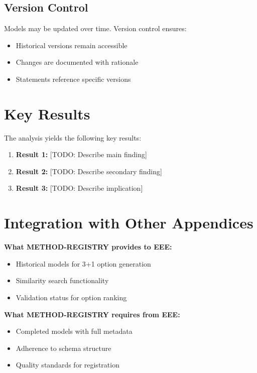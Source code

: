 \subsection{Version Control}

Models may be updated over time. Version control ensures:
\begin{itemize}
\item Historical versions remain accessible
\item Changes are documented with rationale
\item Statements reference specific versions
\end{itemize}



\section{Key Results}
\label{sec:results}

The analysis yields the following key results:

\begin{enumerate}
    \item \textbf{Result 1:} [TODO: Describe main finding]
    \item \textbf{Result 2:} [TODO: Describe secondary finding]
    \item \textbf{Result 3:} [TODO: Describe implication]
\end{enumerate}

\section{Integration with Other Appendices}
\label{sec:fff-integration}

\begin{tcolorbox}[colback=yellow!5!white, colframe=yellow!75!black,
    title=Integration: METHOD-REGISTRY $\leftrightarrow$ METHOD-DESIGN (EEE)]
\textbf{What METHOD-REGISTRY provides to EEE:}
\begin{itemize}[nosep]
\item Historical models for 3+1 option generation
\item Similarity search functionality
\item Validation status for option ranking
\end{itemize}

\textbf{What METHOD-REGISTRY requires from EEE:}
\begin{itemize}[nosep]
\item Completed models with full metadata
\item Adherence to schema structure
\item Quality standards for registration
\end{itemize}
\end{tcolorbox}

